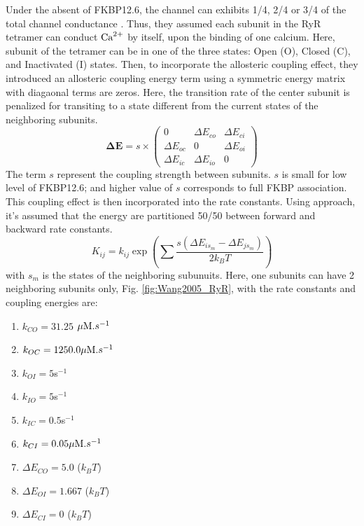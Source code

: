 Under the absent of FKBP12.6, the channel can exhibits 1/4, 2/4 or 3/4 of the
total channel conductance \citep{brillantes1994}. Thus, they assumed each
subunit in the RyR tetramer can conduct ${\text{Ca}^{2+}}$ by itself, upon the binding of one
calcium. Here, subunit of the tetramer can be in one of the three states: Open
(O), Closed (C), and Inactivated (I) states. Then, to incorporate the allosteric
coupling effect, they introduced an allosteric coupling energy term using a
symmetric energy matrix with diagaonal terms are zeros. Here, the transition
rate of the center subunit is penalized for transiting to a state different from
the current states of the neighboring subunits.
\begin{equation*}
\mathbf{\Delta E} = s \times \left( \begin{array}{ccc}
0 & \Delta E_{co} & \Delta E_{ci} \\
\Delta E_{oc} & 0 & \Delta E_{oi} \\
\Delta E_{ic} & \Delta E_{io} & 0
\end{array} \right)
\end{equation*}
The term $s$ represent the coupling strength between subunits. $s$ is small for
low level of FKBP12.6; and higher value of $s$ corresponds to full FKBP
association. This coupling effect is then incorporated into the rate constants.
Using \citep{stern1999lcm} approach, it's assumed that the energy are
partitioned 50/50 between forward and backward rate constants.
\begin{equation}
K_{ij} = k_{ij} \exp\left( \sum\frac{s(\Delta E_{is_m}-\Delta E_{js_m})}{2k_BT}
\right)
\end{equation}
with $s_m$ is the states of the neighboring subunuits. Here, one subunits can
have 2 neighboring subunits only, Fig. \ref{fig:Wang2005_RyR}, with the rate
constants and coupling energies are:
\begin{enumerate}
  \item $k_{CO}=31.25$ ${\mu\text{M}}.s^{-1}$
  \item $k_{OC}=1250.0{\mu\text{M}}.s^{-1}$
  \item $k_{OI}=5$s$^{-1}$
  \item $k_{IO}=5$s$^{-1}$
  \item $k_{IC}=0.5$s$^{-1}$
  \item $k_{CI}=0.05{\mu\text{M}}.s^{-1}$
  \item $\Delta E_{CO}=5.0$ ($k_BT$)
  \item $\Delta E_{OI}=1.667$ ($k_BT$)
  \item $\Delta E_{CI}=0$ ($k_BT$)
\end{enumerate}


